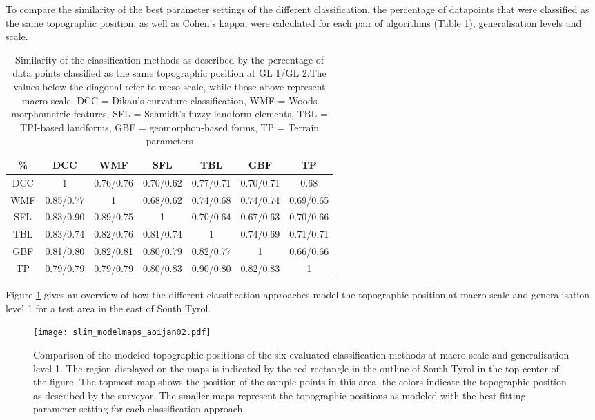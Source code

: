 \documentclass[preprint,12pt,authoryear]{elsarticle}
\begin{document}
To compare the similarity of the best parameter settings of the different classification, the percentage of datapoints that were classified as the same topographic position, as well as Cohen's kappa, were calculated for each pair of algorithms (Table \ref{table:similarity_matrix}), generalisation levels and scale. 
\begin{table}[ht]
\caption{Similarity of the classification methods as described by the percentage of data points classified as the same topographic position at GL 1/GL 2.The values below the diagonal refer to meso scale, while those above represent macro scale. DCC = Dikau's curvature classification, WMF = Woods morphometric features, SFL = Schmidt's fuzzy landform elements, TBL = TPI-based landforms, GBF = geomorphon-based forms, TP = Terrain parameters}
\centering
\begin{tabular}{ccccccc}
  \hline
\%  & DCC & WMF &SFL &TBL & GBF & TP \\ 
  \hline
DCC &1 & 0.76/0.76 & 0.70/0.62 & 0.77/0.71 & 0.70/0.71 & 0.68 \\ 
WMF &0.85/0.77  & 1 & 0.68/0.62 & 0.74/0.68 & 0.74/0.74 & 0.69/0.65 \\ 
SFL & 0.83/0.90 & 0.89/0.75 & 1 & 0.70/0.64 & 0.67/0.63 & 0.70/0.66 \\ 
TBL & 0.83/0.74 &0.82/0.76  &0.81/0.74  & 1 & 0.74/0.69 & 0.71/0.71 \\ 
GBF &0.81/0.80  &0.82/0.81  & 0.80/0.79  & 0.82/0.77 & 1 & 0.66/0.66 \\ 
TP &0.79/0.79  &0.79/0.79  &0.80/0.83  &0.90/0.80  &0.82/0.83  & 1 \\ 
   \hline
\end{tabular}
\label{table:similarity_matrix}
\end{table}
Figure \ref{fig:resultmaps} gives an overview of how the different classification approaches model the topographic position at macro scale and generalisation level 1 for a test area in the east of South Tyrol.
\begin{figure}
\texttt{[image: slim\_modelmaps\_aoijan02.pdf]}
\caption{Comparison of the modeled topographic positions of the six evaluated classification methods at macro scale and generalisation level 1. The region displayed on the maps is indicated by the red rectangle in the outline of South Tyrol in the top center of the figure. The topmost map shows the position of the sample points in this area, the colors indicate the topographic position as described by the surveyor. The smaller maps represent the topographic positions as modeled with the best fitting parameter setting for each classification approach.}
\label{fig:resultmaps}
\end{figure}
\end{document}

